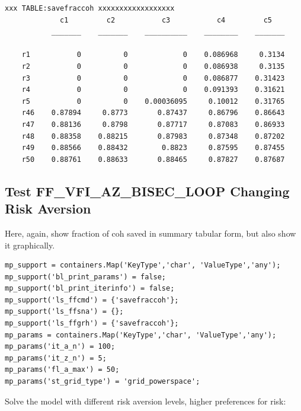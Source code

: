 \documentclass[
]{book}
\begin{document}
\begin{verbatim}
xxx TABLE:savefraccoh xxxxxxxxxxxxxxxxxx
             c1         c2           c3           c4         c5   
           _______    _______    __________    ________    _______

    r1           0          0             0    0.086968     0.3134
    r2           0          0             0    0.086938     0.3135
    r3           0          0             0    0.086877    0.31423
    r4           0          0             0    0.091393    0.31621
    r5           0          0    0.00036095     0.10012    0.31765
    r46    0.87894     0.8773       0.87437     0.86796    0.86643
    r47    0.88136     0.8798       0.87717     0.87083    0.86933
    r48    0.88358    0.88215       0.87983     0.87348    0.87202
    r49    0.88566    0.88432        0.8823     0.87595    0.87455
    r50    0.88761    0.88633       0.88465     0.87827    0.87687
\end{verbatim}

\hypertarget{test-ff_vfi_az_bisec_loop-changing-risk-aversion}{%
\subsection{Test FF\_VFI\_AZ\_BISEC\_LOOP Changing Risk Aversion}\label{test-ff_vfi_az_bisec_loop-changing-risk-aversion}}

Here, again, show fraction of coh saved in summary tabular form, but
also show it graphically.

\begin{verbatim}
mp_support = containers.Map('KeyType','char', 'ValueType','any');
mp_support('bl_print_params') = false;
mp_support('bl_print_iterinfo') = false;
mp_support('ls_ffcmd') = {'savefraccoh'};
mp_support('ls_ffsna') = {};
mp_support('ls_ffgrh') = {'savefraccoh'};
mp_params = containers.Map('KeyType','char', 'ValueType','any');
mp_params('it_a_n') = 100;
mp_params('it_z_n') = 5;
mp_params('fl_a_max') = 50;
mp_params('st_grid_type') = 'grid_powerspace';
\end{verbatim}

Solve the model with different risk aversion levels, higher preferences
for risk:
\end{document}
